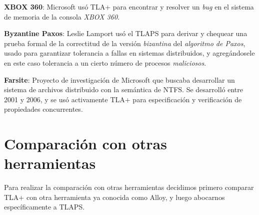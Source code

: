 \documentclass[spanish]{llncs}
\begin{document}
\textbf{XBOX 360}: Microsoft usó TLA+ para encontrar y resolver un \textit{bug} en el sistema de memoria de la consola \textit{XBOX 360}. \cite{xbox360}

\textbf{Byzantine Paxos}: Leslie Lamport usó el TLAPS para derivar y chequear una prueba formal de la correctitud de la versión \textit{bizantina} del \textit{algoritmo de Paxos},
usado para garantizar tolerancia a fallas en sistemas distribuidos, y agregándosele en este caso tolerancia a un cierto número de procesos \textit{maliciosos}. \cite{byzpaxos}

\textbf{Farsite}: Proyecto de investigación de Microsoft que buscaba desarrollar un sistema de archivos distribuido con la semántica de NTFS.
Se desarrolló entre 2001 y 2006, y se usó activamente TLA+ para especificación y verificación de propiedades concurrentes. \cite{farsite}

\section{Comparación con otras herramientas}
Para realizar la comparación con otras herramientas decidimos primero comparar TLA+ con otra herramienta ya conocida como Alloy,
y luego abocarnos específicamente a TLAPS.
\end{document}
